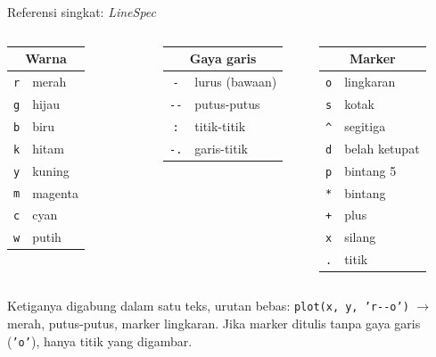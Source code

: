 \documentclass[10pt,aspectratio=169]{beamer}
\newcommand{\kd}[1]{\texttt{#1}}
\begin{document}
\begin{frame}{Referensi singkat: \emph{LineSpec}}
\small
\begin{columns}[T,onlytextwidth]
\begin{tabular}{@{}cl@{}}
\toprule
\multicolumn{2}{c}{Warna}\\
\midrule
\kd{r} & merah\\ \kd{g} & hijau\\ \kd{b} & biru\\ \kd{k} & hitam\\
\kd{y} & kuning\\ \kd{m} & magenta\\ \kd{c} & cyan\\ \kd{w} & putih\\
\bottomrule
\end{tabular}
\begin{tabular}{@{}cl@{}}
\toprule
\multicolumn{2}{c}{Gaya garis}\\
\midrule
\kd{-}  & lurus (bawaan)\\
\kd{-{}-} & putus-putus\\
\kd{:}  & titik-titik\\
\kd{-.} & garis-titik\\
\bottomrule
\end{tabular}
\begin{tabular}{@{}cl@{}}
\toprule
\multicolumn{2}{c}{Marker}\\
\midrule
\kd{o} & lingkaran\\ \kd{s} & kotak\\ \kd{\textasciicircum} & segitiga\\
\kd{d} & belah ketupat\\ \kd{p} & bintang 5\\ \kd{*} & bintang\\
\kd{+} & plus\\ \kd{x} & silang\\ \kd{.} & titik\\
\bottomrule
\end{tabular}
\end{columns}

\medskip
Ketiganya digabung dalam satu teks, \alert{urutan bebas}: \kd{plot(x, y, 'r-{}-o')} $\rightarrow$ merah, putus-putus, marker lingkaran. Jika marker ditulis tanpa gaya garis (\kd{'o'}), hanya titik yang digambar.
\end{frame}
\end{document}
